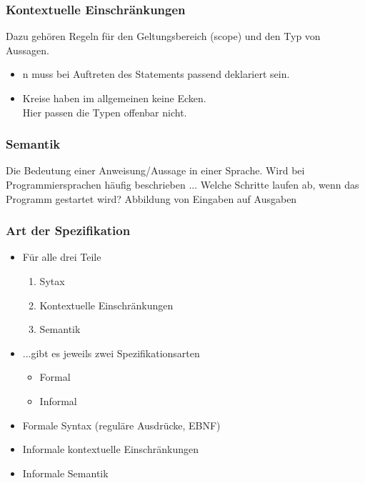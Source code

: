 \subsubsection*{Kontextuelle Einschränkungen}
\begin{grayInfoBox}
	Dazu gehören Regeln für den Geltungsbereich (scope) und den Typ von Aussagen. 
	\begin{itemize}
		\item n muss bei Auftreten des Statements passend deklariert sein.
		\item Kreise haben im allgemeinen keine Ecken.\\
		Hier passen die Typen offenbar nicht.
	\end{itemize}
\end{grayInfoBox}

\subsubsection*{Semantik}
\begin{grayInfoBox}
	Die Bedeutung einer Anweisung/Aussage in einer Sprache. Wird bei Programmiersprachen häufig beschrieben ...
	 Welche Schritte laufen ab, wenn das Programm gestartet wird?
	 Abbildung von Eingaben auf Ausgaben
\end{grayInfoBox}

\subsubsection*{Art der Spezifikation}
\begin{itemize}
	\item Für alle drei Teile
	\begin{enumerate}
		\item Sytax
		\item Kontextuelle Einschränkungen
		\item Semantik
	\end{enumerate}
	\item ...gibt es jeweils zwei Spezifikationsarten
	\begin{itemize}
		\item Formal
		\item Informal
	\end{itemize}
\end{itemize}
\begin{defBox}[title=Triangle-Spezifikaiton]
    \begin{itemize}
    	\item Formale Syntax (reguläre Ausdrücke, EBNF)
    	\item Informale kontextuelle Einschränkungen
    	\item Informale Semantik
    \end{itemize}
\end{defBox}


